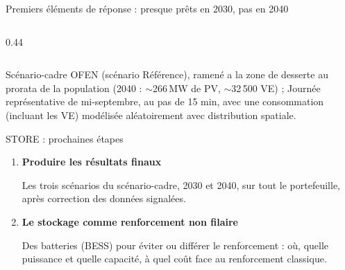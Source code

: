 \documentclass[aspectratio=169,10pt]{beamer}
\begin{document}
\begin{frame}[fragile]{Premiers éléments de réponse : presque prêts en 2030, pas en 2040}
\begin{columns}[c,onlytextwidth]
\begin{column}{0.44\textwidth}
      

    \end{column}
  \end{columns}

  \vfill 
  
  {\footnotesize\color{subtle} Scénario-cadre OFEN (scénario Référence), ramené a la zone de desserte au prorata de la
  population (2040 : $\sim$266\,MW de PV, $\sim$32\,500 VE) ; Journée représentative de mi-septembre, au pas de 15 min, avec une consommation (incluant les VE) modélisée aléatoirement avec distribution spatiale.}
\end{frame}

\begin{frame}{STORE : prochaines étapes}
  \begin{enumerate}
    \setlength{\itemsep}{1.4em}
    \item \textbf{Produire les résultats finaux}\par\smallskip
          Les trois scénarios du scénario-cadre, 2030 et 2040, sur tout
          le portefeuille, après correction des données signalées.
    \item \textbf{Le stockage comme renforcement non filaire}\par\smallskip
          Des batteries (BESS) pour éviter ou différer le renforcement :
          où, quelle puissance et quelle capacité, à quel coût face au
          renforcement classique.
  \end{enumerate}
\end{frame}
\end{document}
